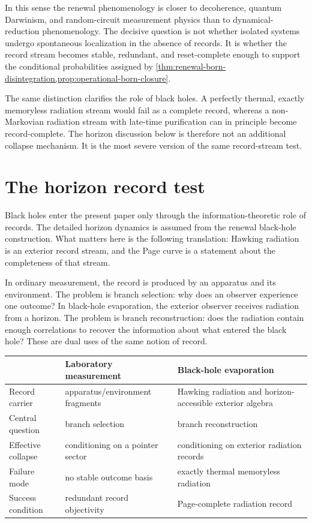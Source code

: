 \documentclass[11pt]{article}
\numberwithin{equation}{section}
\theoremstyle{definition}
\theoremstyle{remark}
\begin{document}
In this sense the renewal phenomenology is closer to decoherence, quantum Darwinism, and random-circuit measurement physics than to dynamical-reduction phenomenology.  The decisive question is not whether isolated systems undergo spontaneous localization in the absence of records.  It is whether the record stream becomes stable, redundant, and reset-complete enough to support the conditional probabilities assigned by \cref{thm:renewal-born-disintegration,prop:operational-born-closure}.

The same distinction clarifies the role of black holes.  A perfectly thermal, exactly memoryless radiation stream would fail as a complete record, whereas a non-Markovian radiation stream with late-time purification can in principle become record-complete.  The horizon discussion below is therefore not an additional collapse mechanism.  It is the most severe version of the same record-stream test.

\section{The horizon record test}
\label{sec:horizon}

Black holes enter the present paper only through the information-theoretic role of records.  The detailed horizon dynamics is assumed from the renewal black-hole construction.  What matters here is the following translation: Hawking radiation is an exterior record stream, and the Page curve is a statement about the completeness of that stream.

In ordinary measurement, the record is produced by an apparatus and its environment.  The problem is branch selection: why does an observer experience one outcome?  In black-hole evaporation, the exterior observer receives radiation from a horizon.  The problem is branch reconstruction: does the radiation contain enough correlations to recover the information about what entered the black hole?  These are dual uses of the same notion of record.

\begin{center}
\small
\renewcommand{\arraystretch}{1.15}
\begin{tabularx}{\textwidth}{@{}p{}p{}X@{}}
\toprule
& \textbf{Laboratory measurement} & \textbf{Black-hole evaporation}\\
\midrule
Record carrier & apparatus/environment fragments & Hawking radiation and horizon-accessible exterior algebra\\
Central question & branch selection & branch reconstruction\\
Effective collapse & conditioning on a pointer sector & conditioning on exterior radiation records\\
Failure mode & no stable outcome basis & exactly thermal memoryless radiation\\
Success condition & redundant record objectivity & Page-complete radiation record\\
\bottomrule
\end{tabularx}
\end{center}
\end{document}
